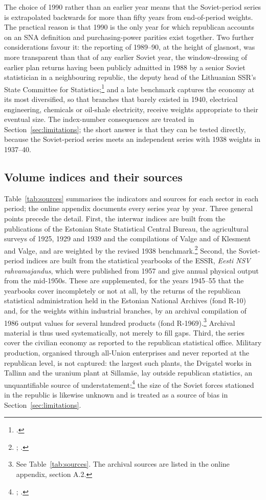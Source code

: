 The choice of 1990 rather than an earlier year means that the Soviet-period series is extrapolated backwards for more than fifty years from end-of-period weights. The practical reason is that 1990 is the only year for which republican accounts on an SNA definition and purchasing-power parities exist together. Two further considerations favour it: the reporting of 1989--90, at the height of glasnost, was more transparent than that of any earlier Soviet year, the window-dressing of earlier plan returns having been publicly admitted in 1988 by a senior Soviet statistician in a neighbouring republic, the deputy head of the Lithuanian SSR's State Committee for Statistics;\footnote{\autocite{adlys1988}.} and a late benchmark captures the economy at its most diversified, so that branches that barely existed in 1940, electrical engineering, chemicals or oil-shale electricity, receive weights appropriate to their eventual size. The index-number consequences are treated in Section~\ref{sec:limitations}; the short answer is that they can be tested directly, because the Soviet-period series meets an independent series with 1938 weights in 1937--40.

\subsection{Volume indices and their sources}

Table~\ref{tab:sources} summarises the indicators and sources for each sector in each period; the online appendix documents every series year by year. Three general points precede the detail. First, the interwar indices are built from the publications of the Estonian State Statistical Central Bureau, the agricultural surveys of 1925, 1929 and 1939 and the compilations of Valge and of Klesment and Valge, and are weighted by the revised 1938 benchmark.\footnote{\autocite{valge2003all}; \autocite{klesment2007}.} Second, the Soviet-period indices are built from the statistical yearbooks of the ESSR, \textit{Eesti NSV rahvamajandus}, which were published from 1957 and give annual physical output from the mid-1950s. These are supplemented, for the years 1945--55 that the yearbooks cover incompletely or not at all, by the returns of the republican statistical administration held in the Estonian National Archives (fond R-10) and, for the weights within industrial branches, by an archival compilation of 1986 output values for several hundred products (fond R-1969).\footnote{See Table~\ref{tab:sources}. The archival sources are listed in the online appendix, section A.2.} Archival material is thus used systematically, not merely to fill gaps. Third, the series cover the civilian economy as reported to the republican statistical office. Military production, organised through all-Union enterprises and never reported at the republican level, is not captured: the largest such plants, the Dvigatel works in Tallinn and the uranium plant at Sillam\"{a}e, lay outside republican statistics, an unquantifiable source of understatement;\footnote{\autocite[150]{kukk2005}; \autocite[35]{ahderajasalu1992}.} the size of the Soviet forces stationed in the republic is likewise unknown and is treated as a source of bias in Section~\ref{sec:limitations}.

